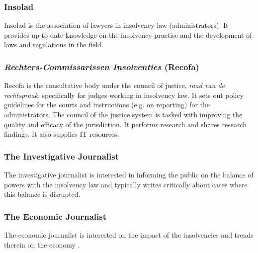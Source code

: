 \subsubsection{Insolad}
Insolad is the association of lawyers in insolvency law (administrators). It provides up-to-date knowledge on the insolvency practise and the development of laws and regulations in the field.

\subsubsection{\textit{Rechters-Commissarissen Insolventies} (Recofa)}
Recofa is the consultative body under the council of justice, \textit{raad van de rechtspraak}, specifically for judges working in insolvency law. It sets out policy guidelines for the courts and instructions (e.g. on reporting) for the administrators. The council of the justice system is tasked with improving the quality and efficacy of the jurisdiction. It performs research and shares research findings. It also supplies IT resources.

\subsubsection{The Investigative Journalist}
The investigative journalist is interested in informing the public on the balance of powers with the insolvency law and typically writes critically about cases where this balance is disrupted.

\subsubsection{The Economic Journalist}
The economic journalist is interested on the impact of the insolvencies and trends therein on the economy .
